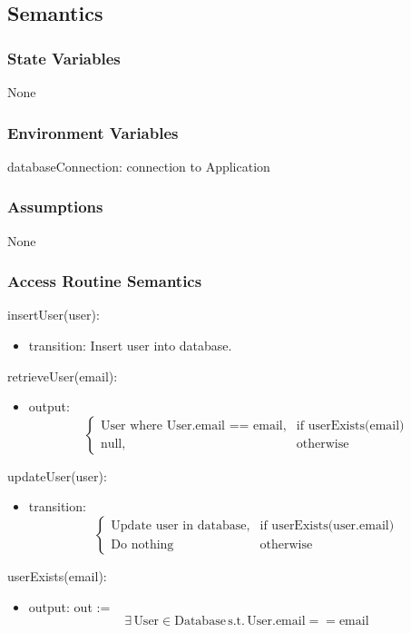 \documentclass[12pt, titlepage]{article}
\begin{document}
\subsection{Semantics}

\subsubsection{State Variables}
None
\subsubsection{Environment Variables}
databaseConnection: connection to Application

\subsubsection{Assumptions}
None

\subsubsection{Access Routine Semantics}

\noindent insertUser(user):
\begin{itemize}
\item transition: Insert user into database.
\end{itemize}

\noindent retrieveUser(email):
\begin{itemize}
\item output: 
\[
\begin{cases}
    \text{User where User.email == email}, & \text{if } \text{userExists(email)}\\
    \text{null}, & \text{otherwise}
\end{cases}
\]
\end{itemize}

\noindent updateUser(user):
\begin{itemize}
\item transition: 
\[
\begin{cases}
    \text{Update user in database}, & \text{if } \text{userExists(user.email)}\\
    \text{Do nothing} & \text{otherwise}
\end{cases}
\]
\end{itemize}

\noindent userExists(email):
\begin{itemize}
\item output: out := 
\[ \exists \, \text{User} \in \text{Database} \, \text{s.t.} \, \text{User.email} == \text{email}
\]
\end{itemize}
\end{document}
